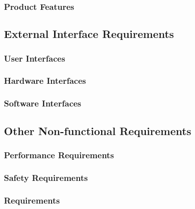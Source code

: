 \documentclass{article}
\begin{document}
        \subsubsection{Product Features}
        

    \subsection{External Interface Requirements}
    
        \subsubsection{User Interfaces}
        
        \subsubsection{Hardware Interfaces}
        
        \subsubsection{Software Interfaces}
        
    
    \subsection{Other Non-functional Requirements}
    
        \subsubsection{Performance Requirements}
        
        \subsubsection{Safety Requirements}
        
        \subsubsection{Requirements}


\newpage

\end{document}
